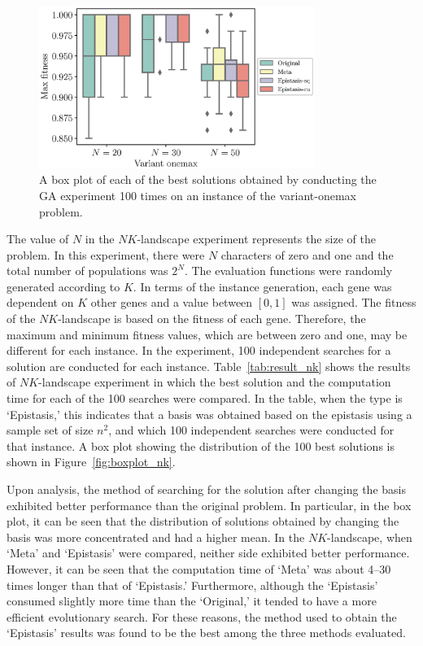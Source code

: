 \begin{figure}[H]
	\centering
	\includegraphics[width=0.8\textwidth]{./boxplot_Onemax}
	\caption{A box plot of each of the best solutions obtained by conducting the GA experiment 100 times on an instance of the variant-onemax problem.} \label{fig:boxplot_var}
\end{figure}

The value of $ N $ in the $ NK $-landscape experiment represents the size of the problem. In this experiment, there were $ N $ characters of zero and one and the total number of populations was $ 2^N $. The evaluation functions were randomly generated according to $ K $. In terms of the instance generation, each gene was dependent on $ K $ other genes and a value between $ \left[0,1\right] $ was assigned. The fitness of the $ NK $-landscape is based on the fitness of each gene. Therefore, the maximum and minimum fitness values, which are between zero and one, may be different for each instance. In the experiment, 100 independent searches for a solution are conducted for each instance. Table~\ref{tab:result_nk} shows the results of $ NK $-landscape experiment in which the best solution and the computation time for each of the 100 searches were compared. In the table, when the type is `Epistasis,' this indicates that a basis was obtained based on the epistasis using a sample set of size $ n^2 $, and which 100 independent searches were conducted for that instance. A box plot showing the distribution of the 100 best solutions is shown in Figure~\ref{fig:boxplot_nk}.

Upon analysis, the method of searching for the solution after changing the basis exhibited better performance than the original problem. In particular, in the box plot, it can be seen that the distribution of solutions obtained by changing the basis was more concentrated and had a higher mean. In the $ NK $-landscape, when `Meta' and `Epistasis' were compared, neither side exhibited better performance. However, it can be seen that the computation time of ‘Meta’ was about 4–30 times longer than that of `Epistasis.' Furthermore, although the `Epistasis' consumed slightly more time than the `Original,' it tended to have a more efficient evolutionary search. For these reasons, the method used to obtain the `Epistasis' results was found to be the best among the three methods evaluated.


